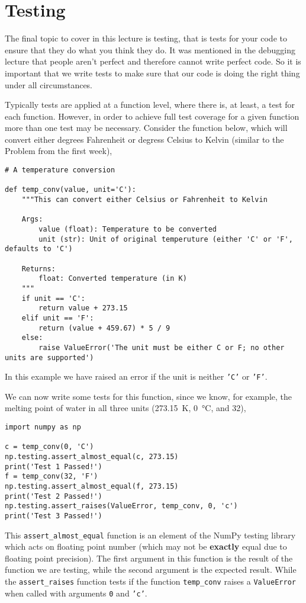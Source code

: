 \documentclass[a4paper]{article}
\begin{document}
\section{Testing}
The final topic to cover in this lecture is testing, that is tests for your code to ensure that they do what you think they do.
It was mentioned in the debugging lecture that people aren't perfect and therefore cannot write perfect code.
So it is important that we write tests to make sure that our code is doing the right thing under all circumstances.

Typically tests are applied at a function level, where there is, at least, a test for each function.
However, in order to achieve full test coverage for a given function more than one test may be necessary.
Consider the function below, which will convert either degrees Fahrenheit or degress Celsius to Kelvin (similar to the Problem from the first week),
\begin{lstlisting}
# A temperature conversion

def temp_conv(value, unit='C'):
    """This can convert either Celsius or Fahrenheit to Kelvin

    Args:
        value (float): Temperature to be converted
        unit (str): Unit of original temperuture (either 'C' or 'F', defaults to 'C')

    Returns:
        float: Converted temperature (in K)
    """
    if unit == 'C':
        return value + 273.15
    elif unit == 'F':
        return (value + 459.67) * 5 / 9
    else:
        raise ValueError('The unit must be either C or F; no other units are supported')
\end{lstlisting}
In this example we have raised an error if the unit is neither \texttt{'C'} or \texttt{'F'}.

We can now write some tests for this function, since we know, for example, the melting point of water in all three units (\SI{273.15}{\kelvin}, \SI{0}{\celsius}, and \SI{32}{\Fahrenheit}),
\begin{lstlisting}
import numpy as np

c = temp_conv(0, 'C')
np.testing.assert_almost_equal(c, 273.15)
print('Test 1 Passed!')
f = temp_conv(32, 'F')
np.testing.assert_almost_equal(f, 273.15)
print('Test 2 Passed!')
np.testing.assert_raises(ValueError, temp_conv, 0, 'c')
print('Test 3 Passed!')
\end{lstlisting}
This \texttt{assert\_almost\_equal} function is an element of the NumPy testing library which acts on floating point number (which may not be \textbf{exactly} equal due to floating point precision).
The first argument in this function is the result of the function we are testing, while the second argument is the expected result.
While the \texttt{assert\_raises} function tests if the function \texttt{temp\_conv} raises a \texttt{ValueError} when called with arguments \texttt{0} and \texttt{'c'}.
\end{document}
